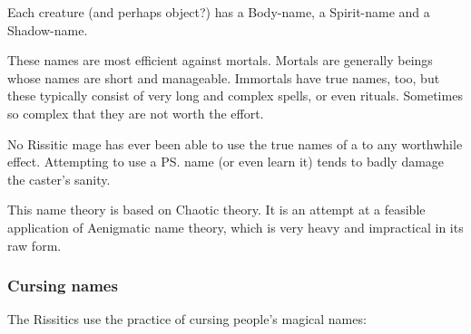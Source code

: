 Each creature (and perhaps object?) has a Body-name, a Spirit-name and a Shadow-name. 

These names are most efficient against mortals. 
Mortals are generally  beings whose names are short and manageable. 
Immortals have true names, too, but these typically consist of very long and complex spells, or even rituals. 
Sometimes so complex that they are not worth the effort. 

No Rissitic mage has ever been able to use the true names of a \bane{} to any worthwhile effect. 
Attempting to use a \ps{\bane}{} name (or even learn it) tends to badly damage the caster's sanity. 

This name theory is based on Chaotic  theory. 
It is an attempt at a feasible application of Aenigmatic name theory, which is very heavy and impractical in its raw form. 





\subsubsection{Cursing names}
The Rissitics use the practice of cursing people's magical names:






